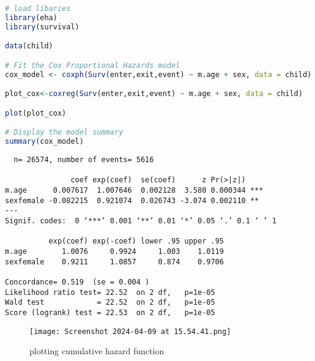 \documentclass[12pt,letterpaper]{article}
\begin{document}
\begin{lstlisting}[language=R] 
# load libaries
library(eha)
library(survival)

data(child)

# Fit the Cox Proportional Hazards model
cox_model <- coxph(Surv(enter,exit,event) ~ m.age + sex, data = child)

plot_cox<-coxreg(Surv(enter,exit,event) ~ m.age + sex, data = child)

plot(plot_cox)

# Display the model summary
summary(cox_model)

\end{lstlisting} 
\newpage
\begin{verbatim}
  n= 26574, number of events= 5616 

               coef exp(coef)  se(coef)      z Pr(>|z|)    
m.age      0.007617  1.007646  0.002128  3.580 0.000344 ***
sexfemale -0.082215  0.921074  0.026743 -3.074 0.002110 ** 
---
Signif. codes:  0 ‘***’ 0.001 ‘**’ 0.01 ‘*’ 0.05 ‘.’ 0.1 ‘ ’ 1

          exp(coef) exp(-coef) lower .95 upper .95
m.age        1.0076     0.9924     1.003    1.0119
sexfemale    0.9211     1.0857     0.874    0.9706

Concordance= 0.519  (se = 0.004 )
Likelihood ratio test= 22.52  on 2 df,   p=1e-05
Wald test            = 22.52  on 2 df,   p=1e-05
Score (logrank) test = 22.53  on 2 df,   p=1e-05
\end{verbatim}
\begin{figure}[ht]
\centering
\texttt{[image: Screenshot 2024-04-09 at 15.54.41.png]}
\caption{plotting cumulative hazard function}
\label{}
\end{figure}
\end{document}
